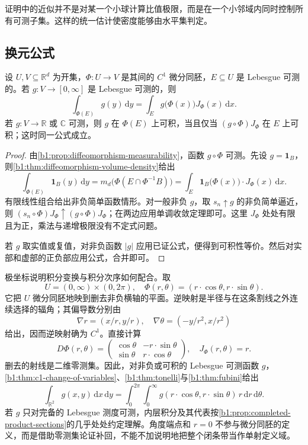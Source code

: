 证明中的近似并不是对某一个小球计算比值极限，而是在一个小邻域内同时控制所有可测子集。这样的统一估计使密度能够由水平集判定。

\subsection{换元公式}
\label{b1:subsec:070504}

\begin{theorem}[\(C^1\) 微分同胚的换元公式]\label{b1:thm:c1-change-of-variables}
设 \(U,V\subseteq\mathbb R^d\) 为开集，\(\Phi:U\rightarrow V\) 是其间的 \(C^1\) 微分同胚，\(E\subseteq U\) 是 Lebesgue 可测的。若 \(g:V\rightarrow[0,\infty]\) 是 Lebesgue 可测的，则
\[
\int_{\Phi(E)}g(y)\,\mathrm{d}y
=\int_E g\bigl(\Phi(x)\bigr)J_\Phi(x)\,\mathrm{d}x.
\]
若 \(g:V\rightarrow\mathbb R\) 或 \(\mathbb C\) 可测，则 \(g\) 在 \(\Phi(E)\) 上可积，当且仅当 \((g\circ\Phi)J_\Phi\) 在 \(E\) 上可积；这时同一公式成立。
\end{theorem}
\begin{proof}
由\cref{b1:prop:diffeomorphism-measurability}，函数 \(g\circ\Phi\) 可测。先设 \(g=\mathbf1_B\)，则\cref{b1:thm:diffeomorphism-volume-density}给出
\[
\int_{\Phi(E)}\mathbf1_B(y)\,\mathrm{d}y
=m_d\bigl(\Phi(E\cap\Phi^{-1}B)\bigr)
=\int_E\mathbf1_B\bigl(\Phi(x)\bigr)\cdot J_\Phi(x)\,\mathrm{d}x.
\]
有限线性组合给出非负简单函数情形。对一般非负 \(g\)，取 \(s_n\uparrow g\) 的非负简单逼近，则
\((s_n\circ\Phi)J_\Phi\uparrow(g\circ\Phi)J_\Phi\)；在两边应用单调收敛定理即可。这里 \(J_\Phi\) 处处有限且为正，乘法与递增极限没有不定式问题。

若 \(g\) 取实值或复值，对非负函数 \(|g|\) 应用已证公式，便得到可积性等价。然后对实部和虚部的正负部应用公式，合并即可。
\end{proof}

极坐标说明积分变换与积分次序如何配合。取
\[
U=(0,\infty)\times(0,2\pi),
\quad
\Phi(r,\theta)=(r\cdot \cos\theta,r\cdot \sin\theta).
\]
它把 \(U\) 微分同胚地映到删去非负横轴的平面。逆映射是半径与在这条割线之外连续选择的辐角；其偏导数分别由
\[
\nabla r=(x/r,y/r),\quad
\nabla\theta=(-y/r^2,x/r^2)
\]
给出，因而逆映射确为 \(C^1\)。直接计算
\[
D\Phi(r,\theta)=
\begin{pmatrix}
\cos\theta&-r\cdot \sin\theta\\
\sin\theta&r\cdot \cos\theta
\end{pmatrix},
\quad J_\Phi(r,\theta)=r.
\]
删去的射线是二维零测集。因此，对非负或可积的 Lebesgue 可测函数 \(g\)，\cref{b1:thm:c1-change-of-variables}、\cref{b1:thm:tonelli}与\cref{b1:thm:fubini}给出
\[
\int_{\mathbb R^2}g(x,y)\,\mathrm{d}x\,\mathrm{d}y
=\int_0^{2\pi}\int_0^\infty
g(r\cdot \cos\theta,r\cdot \sin\theta)\,r\,\mathrm{d}r\,\mathrm{d}\theta.
\]
若 \(g\) 只对完备的 Lebesgue 测度可测，内层积分及其代表按\cref{b1:prop:completed-product-sections}的几乎处处约定理解。角度端点和 \(r=0\) 不参与微分同胚的定义，而是借助零测集论证补回，不能不加说明地把整个闭条带当作单射定义域。

